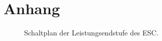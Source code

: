 \appendix
\chapter{Anhang}
	\begin{figure}[h]
		\centering
		
		\caption[Schaltplan der Leistungsendstufe des ESC]{Schaltplan der Leistungsendstufe des ESC\cite{vesc.documentation.2015}.}
		\label{fig:power mosfets}
	\end{figure}